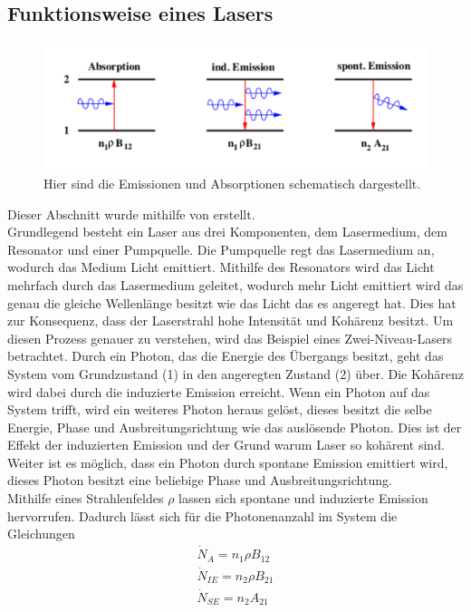 \subsection{Funktionsweise eines Lasers}
\begin{figure}[b!]
	\centering
	\includegraphics[width = \textwidth]{../Grafiken/Emission.pdf}
	\caption{Hier sind die Emissionen und Absorptionen schematisch dargestellt.\cite{V61}}
\end{figure}
Dieser Abschnitt wurde mithilfe von \cite{V61} erstellt.\\
Grundlegend besteht ein Laser aus drei Komponenten, dem Lasermedium, dem Resonator und einer Pumpquelle.
Die Pumpquelle regt das Lasermedium an, wodurch das Medium Licht emittiert.
Mithilfe des Resonators wird das Licht mehrfach durch das Lasermedium geleitet, wodurch mehr Licht emittiert wird das genau die gleiche Wellenlänge besitzt wie das Licht das es angeregt hat.
Dies hat zur Konsequenz, dass der Laserstrahl hohe Intensität und  Kohärenz besitzt.
Um diesen Prozess genauer zu verstehen, wird das Beispiel eines Zwei-Niveau-Lasers betrachtet.
Durch ein Photon, das die Energie des Übergangs besitzt, geht das System vom Grundzustand (1) in den angeregten Zustand (2) über.
Die Kohärenz wird dabei durch die induzierte Emission erreicht.
Wenn ein Photon auf das System  trifft, wird ein weiteres Photon heraus gelöst, dieses besitzt die selbe Energie, Phase und Ausbreitungsrichtung wie das auslösende Photon.
Dies ist der Effekt der induzierten Emission und der Grund warum Laser so kohärent sind.
Weiter ist es möglich, dass ein Photon durch spontane Emission emittiert wird, dieses Photon besitzt eine beliebige Phase und Ausbreitungsrichtung.\\
Mithilfe eines Strahlenfeldes $\rho$ lassen sich spontane und induzierte Emission hervorrufen.
Dadurch lässt sich für die Photonenanzahl im System die Gleichungen
\begin{align}
	\dot{N}_A=n_1\rho B_{12}\\
	\dot{N}_{IE}=n_2\rho B_{21}\\
	\dot{N}_{SE}=n_2A_{21}
\end{align}
